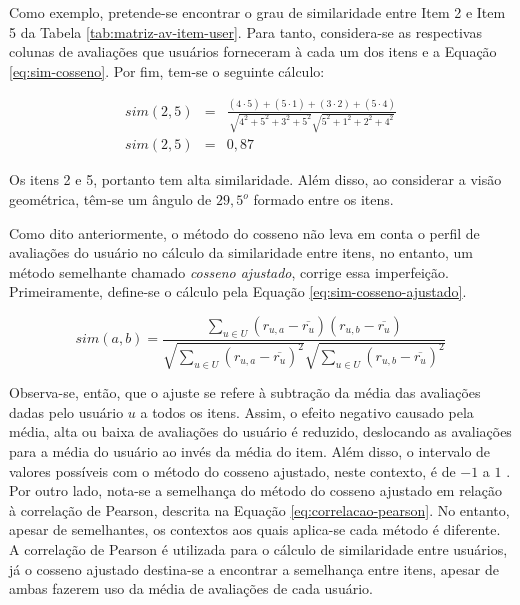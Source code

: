         Como exemplo, pretende-se encontrar o grau de similaridade entre Item 2 e Item 5 da Tabela \ref{tab:matriz-av-item-user}. Para tanto, considera-se as respectivas colunas de avaliações que usuários forneceram à cada um dos itens e a Equação \ref{eq:sim-cosseno}. Por fim, tem-se o seguinte cálculo:
        
        \begin{eqnarray}
            sim(2, 5) &=& \frac{(4\cdot 5)+(5\cdot 1)+(3\cdot 2)+(5 \cdot 4)}{\sqrt{4^2+5^2+3^2+5^2}\sqrt{5^2+1^2+2^2+4^2}} \nonumber \\
            sim(2, 5) &=& 0,87 \nonumber
        \end{eqnarray}
        
        Os itens 2 e 5, portanto tem alta similaridade. Além disso, ao considerar a visão geométrica, têm-se um ângulo de $29,5^o$ formado entre os itens.
    
        Como dito anteriormente, o método do cosseno não leva em conta o perfil de avaliações do usuário no cálculo da similaridade entre itens, no entanto, um método semelhante chamado \textit{cosseno ajustado}, corrige essa imperfeição. Primeiramente, define-se o cálculo pela Equação \ref{eq:sim-cosseno-ajustado}.
        
        \begin{equation}
             sim(a, b) = \frac{\sum_{u\in U}(r_{u, a}-\overline{r_u})(r_{u, b}-\overline{r_u})}{\sqrt{\sum_{u\in U}(r_{u, a}-\overline{r_u})^2}\sqrt{\sum_{u\in U}(r_{u, b}-\overline{r_u})^2}} \label{eq:sim-cosseno-ajustado}
        \end{equation}
        
        Observa-se, então, que o ajuste se refere à subtração da média das avaliações dadas pelo usuário $u$ a todos os itens. Assim, o efeito negativo causado pela média, alta ou baixa de avaliações do usuário é reduzido, deslocando as avaliações para a média do usuário ao invés da média do item. Além disso, o intervalo de valores possíveis com o método do cosseno ajustado, neste contexto, é de $-1$ a $1$ \cite{Jannach2010, Ricci2010}. Por outro lado, nota-se a semelhança do método do cosseno ajustado em relação à correlação de Pearson, descrita na Equação \ref{eq:correlacao-pearson}. No entanto, apesar de semelhantes, os contextos aos quais aplica-se cada método é diferente. A correlação de Pearson é utilizada para o cálculo de similaridade entre usuários, já o cosseno ajustado destina-se a encontrar a semelhança entre itens, apesar de ambas fazerem uso da média de avaliações de cada usuário.
        
